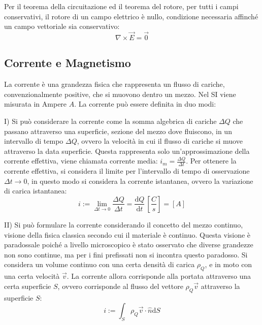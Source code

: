 \documentclass{article}
\newcommand{\df}{\mathrm{d}}
\numberwithin{equation}{subsection}
\begin{document}
Per il teorema della circuitazione ed il teorema del rotore, per tutti i campi conservativi, il rotore di un campo elettrico è nullo, condizione necessaria affinché un campo 
vettoriale sia conservativo: 
\begin{equation}
    {\nabla}\times\vec{E}=\vec0
\end{equation}

\subsection{Corrente e Magnetismo}

La corrente è una grandezza fisica che rappresenta un flusso di cariche, convenzionalmente positive, che si muovono dentro un mezzo. Nel SI viene misurata in Ampere $A$. 
La corrente può essere definita in duo modi:  


I) Si può considerare la corrente come la somma algebrica di cariche $\Delta Q$ che passano attraverso una superficie, sezione del 
mezzo dove fluiscono, in un intervallo di tempo $\Delta Q$, ovvero la velocità in cui il flusso di cariche si muove attraverso la data superficie. Questa rappresenta solo 
un'approssimazione della corrente effettiva, viene chiamata corrente media: $i_m=\displaystyle\frac{\Delta Q}{\Delta t}$. Per ottenere la corrente effettiva, si considera il 
limite per l'intervallo di tempo di osservazione $\Delta t\to0$, in questo modo si considera la corrente istantanea, ovvero la variazione di carica istantanea:
\begin{equation}
    i:=\lim_{\Delta t\to0}\displaystyle\frac{\Delta Q}{\Delta t}=\frac{\df Q}{\df t}\,\left[\frac{C}{s}\right]=[A]
\end{equation}  

II) Si può formulare la corrente considerando il concetto del mezzo continuo, visione della fisica classica secondo cui il materiale è continuo. Questa visione è paradossale 
poiché a livello microscopico è stato osservato che diverse grandezze non sono continue, ma per i fini prefissati non si incontra questo paradosso. Si considera un volume 
continuo con una certa densità di carica $\rho_Q$, e in moto con una certa velocità $\vec{v}$. La corrente allora corrisponde alla portata attraverso una certa superficie $S$, 
ovvero corrisponde al flusso del vettore $\rho_Q\vec{v}$ attraverso la superficie $S$: 
\begin{equation}
    i:=\displaystyle\int_S\rho_Q\vec{v}\cdot\hat{n}\df S
\end{equation}
\end{document}

